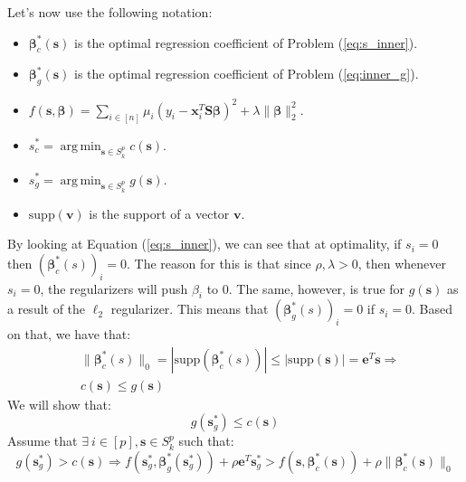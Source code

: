 \documentclass{article}%
\DeclareMathOperator*{\argmin}{arg\,min}
\begin{document}
\begin{enumerate}[(a)]
\begin{solution}
    Let's now use the following notation:
    \begin{itemize}
        \item $\bm{\beta}^*_c(\bm{s})$ is the optimal regression coefficient of Problem (\ref{eq:s_inner}).
        \item $\bm{\beta}^*_g(\bm{s})$ is the optimal regression coefficient of Problem (\ref{eq:inner_g}).
        \item $f(\bm{s}, \bm{\beta}) = \sum_{i\in[n]} \mu_i(y_i - \mathbf{x}^T_i \bm{S}\boldsymbol{\beta})^2  +\lambda \|\bm{\beta}\|_2^2$.
        \item $s_c^*=\argmin_{\bm{s}\in S_k^p} c(\bm{s})$.
        \item $s_g^*=\argmin_{\bm{s}\in S_k^p} g(\bm{s})$.
        \item $\text{supp}(\bm{v})$ is the support of a vector $\bm{v}$.
    \end{itemize}
    By looking at Equation (\ref{eq:s_inner}), we can see that at optimality, if $s_i=0$ then $(\bm{\beta}^{*}_c(s))_i=0$.
    The reason for this is that since $\rho,\lambda>0$, then whenever $s_i=0$, the regularizers will push $\beta_i$ to $0$.
    The same, however, is true for $g(\bm{s})$ as a result of the $\ell_2$ regularizer.
    This means that $(\bm{\beta}^{*}_g(s))_i=0$ if $s_i=0$.
    Based on that, we have that:
    \begin{equation}
        \label{eq:sparsity}
        \begin{aligned}
            &\|\bm{\beta}^{*}_c(s)\|_0= |\text{supp}(\bm{\beta}^{*}_c(s))| \leq |\text{supp}(\bm{s})| = \bm{e}^T\bm{s}\Longrightarrow\\
            &c(\bm{s})\leq g(\bm{s})
        \end{aligned}
    \end{equation}
    We will show that:
    \begin{equation}
        g(\bm{s}_g^*)\leq c(\bm{s})
    \end{equation}
    Assume that $\exists \: i\in[p], \bm{s}\in S_k^p$ such that:
    \begin{equation}
        \label{eq:contr}
        g(\bm{s}^*_g)>c(\bm{s}) \Longrightarrow f(\bm{s}_g^*, \bm{\beta}^*_g(\bm{s}_g^*))+\rho\bm{e}^T\bm{s}_g^*>f(\bm{s}, \bm{\beta}^*_c(\bm{s}))+\rho\|\bm{\beta}^*_c(\bm{s})\|_0

\end{equation}
\end{solution}
\end{enumerate}
\end{document}
